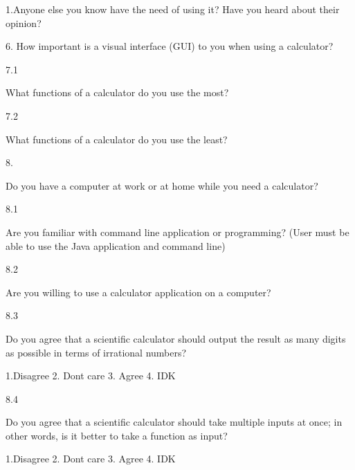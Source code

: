 \documentclass[12pt]{article}
\begin{document}
1.Anyone else you know have the need of using it? Have you heard about their opinion?
  
6.
How important is a visual interface (GUI) to you when using a calculator?

7.1

What functions of a calculator do you use the most?

7.2

What functions of a calculator do you use the least?

8. 

Do you have a computer at work or at home while you need a calculator?

8.1

Are you familiar with command line application or programming?  (User must be able to use the Java application and command line)

8.2

Are you willing to use a calculator application on a computer?

8.3

Do you agree that a scientific calculator should output the result as many digits as possible in terms of irrational numbers?

1.Disagree  2. Dont care 3. Agree 4. IDK

8.4

Do you agree that a scientific calculator should take multiple inputs at once; in other words, is it better to take a function as input?

1.Disagree  2. Dont care 3. Agree 4. IDK
\end{document}
